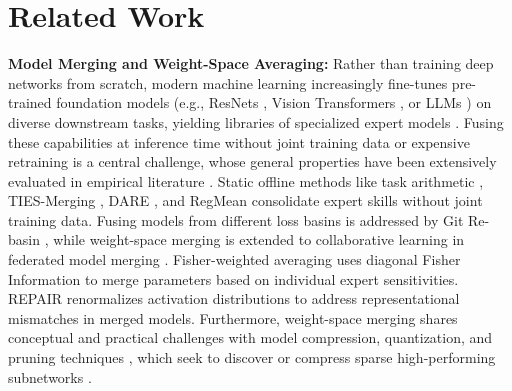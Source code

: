 \documentclass{article}
\theoremstyle{plain}
\theoremstyle{definition}
\theoremstyle{remark}
\begin{document}
\section{Related Work}
\label{sec:related}
\textbf{Model Merging and Weight-Space Averaging:} Rather than training deep networks from scratch, modern machine learning increasingly fine-tunes pre-trained foundation models (e.g., ResNets \cite{he2016deep}, Vision Transformers \cite{dosovitskiy2020image, vaswani2017attention}, or LLMs \cite{touvron2023llama}) on diverse downstream tasks, yielding libraries of specialized expert models \cite{wortsman2022model}. Fusing these capabilities at inference time without joint training data or expensive retraining is a central challenge, whose general properties have been extensively evaluated in empirical literature \cite{liang2021well}. Static offline methods like task arithmetic \cite{ilharco2022editing}, TIES-Merging \cite{yadav2023ties}, DARE \cite{yu2023dare}, and RegMean \cite{jin2023regmean} consolidate expert skills without joint training data. Fusing models from different loss basins is addressed by Git Re-basin \cite{ainsworth2022git}, while weight-space merging is extended to collaborative learning in federated model merging \cite{shao2023federated}. Fisher-weighted averaging \cite{matena2022merging} uses diagonal Fisher Information to merge parameters based on individual expert sensitivities. REPAIR \cite{jordany2022repaired} renormalizes activation distributions to address representational mismatches in merged models. Furthermore, weight-space merging shares conceptual and practical challenges with model compression, quantization, and pruning techniques \cite{gong2014compressing, han2015deep, jacob2018quantization}, which seek to discover or compress sparse high-performing subnetworks \cite{frankle2018lottery, lee2018snip}.
\end{document}
